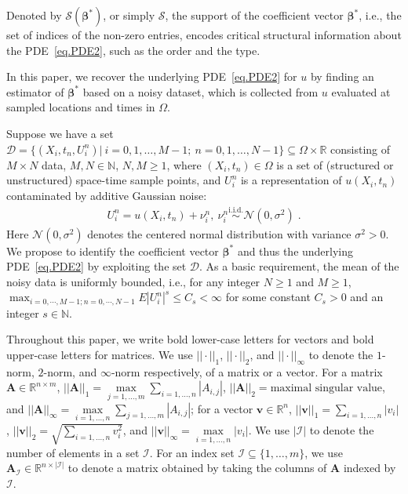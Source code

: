 \documentclass[a4paper,11pt]{article}
\newcommand{\bbeta}{\bm{\beta}}
\begin{document}
Denoted by $\mathcal{S}(\bbeta^*)$, or simply $\mathcal{S}$, the support of the coefficient vector $\bbeta^*$, i.e., the set of indices of the non-zero entries, encodes critical structural information about the PDE~\eqref{eq.PDE2}, such as the order and the type.

In this paper, we recover the underlying PDE~\eqref{eq.PDE2} for $u$ by finding an estimator of $\bbeta^*$ based on a noisy dataset, which is collected from $u$ evaluated at sampled locations and times in $\Omega$.  

Suppose we have a set $\mathcal{D}=\{(X_i,t_n,U_i^n)|~i=0,1,\dots,M-1;~n=0,1,\dots,N-1\}\subseteq\Omega\times\mathbb{R}$ consisting of $M\times N$ data, $M,N\in\mathbb{N}$, $N,M\geq 1$, where $(X_i,t_n)\in\Omega$ is a set of (structured or unstructured) space-time sample points, and $U_i^n$ is a representation of $u(X_i,t_n)$ contaminated by additive Gaussian noise:
\begin{align}
U_i^n=	u(X_i,t_n)+\nu_i^n,~\nu_i^n\overset{\text{i.i.d.}}{\sim}\mathcal{N}(0,\sigma^2)\;.
\end{align}
 Here $\mathcal{N}(0,\sigma^2)$ denotes the centered normal distribution with variance $\sigma^2>0$. We propose to identify the coefficient vector $\bbeta^*$ and thus the underlying PDE~\eqref{eq.PDE2} by exploiting the set $\mathcal{D}$.  As a basic requirement, the mean of the noisy data is uniformly bounded, i.e., for any integer $N\geq 1$ and $M\geq 1$, $\max_{i=0,\cdots, M-1; n=0,\cdots,N-1}E|U_i^n|^s\leq C_s<\infty$ for some constant $C_s>0$ and an integer $s\in\mathbb{N}$. 

 
Throughout this paper, we write bold lower-case letters for vectors and bold upper-case letters for matrices. We use $||\cdot||_1$, $||\cdot||_2$, and $||\cdot||_\infty$ to denote the $1$-norm, $2$-norm, and $\infty$-norm respectively, of  a matrix or a vector. For a matrix $\mathbf{A}\in\mathbb{R}^{n\times m}$, $||\mathbf{A}||_1=\underset{j=1,\dots,m}{\max}\sum_{i=1,\dots,n}|A_{i,j}|$, $||\mathbf{A}||_2=\text{maximal singular value}$, and $||\mathbf{A}||_\infty=\underset{i=1,\dots,n}{\max}\sum_{j=1,\dots,m}|A_{i,j}|$; for a vector $\mathbf{v}\in\mathbb{R}^n$, $||\mathbf{v}||_1=\underset{i=1,\dots,n}{\sum}|v_i|$, $||\mathbf{v}||_2=\sqrt{\underset{i=1,\dots,n}{\sum}v_i^2}$, and $||\mathbf{v}||_\infty=\underset{i=1,\dots,n}{\max}|v_i|$. We use $|\mathcal{I}|$ to denote the number of elements in a set $\mathcal{I}$. For an index set $\mathcal{I}\subseteq\{1,\dots,m\}$, we use $\mathbf{A}_\mathcal{I}\in\mathbb{R}^{n\times |\mathcal{I}|}$ to denote a matrix obtained by taking the columns of $\mathbf{A}$ indexed by $\mathcal{I}$.
\end{document}
